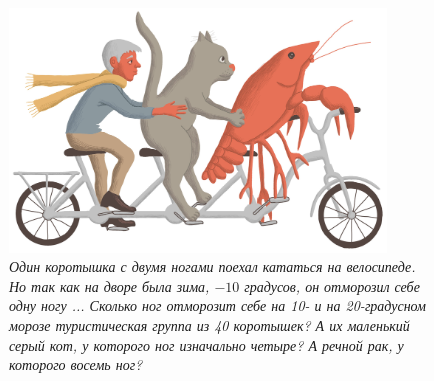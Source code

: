 \documentclass[10pt]{scrbook} \usepackage{modules/nonstahp_book}
\begin{document}
\begin{figure} \begin{center}
	\includegraphics[width=10cm]{figures/color/11c.jpg}
	\vspace{1cm}
	\caption{
             {\itshape  Один коротышка с двумя ногами поехал кататься на велосипеде. 
             Но так как на дворе была зима, $-10$ градусов, он отморозил себе одну ногу ...
             Сколько ног отморозит себе на 10- и на 20-градусном морозе туристическая группа из 
             40 коротышек? А их маленький серый кот, у которого ног изначально четыре? 
             А речной рак, у которого восемь ног? }\medskip\\
             \\
             }
\end{center} \end{figure}
\end{document}
